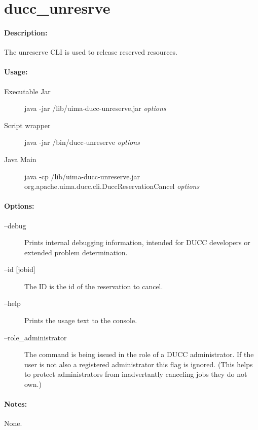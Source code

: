     \section{ducc\_unresrve}

    \paragraph{Description:}
    The unreserve CLI is used to release reserved resources. 

    \paragraph{Usage:}
    \begin{description}
    \item[Executable Jar] java -jar \ducchome/lib/uima-ducc-unreserve.jar {\em options}
    \item[Script wrapper] java -jar \ducchome/bin/ducc-unreserve {\em options}
    \item[Java Main]      java -cp \ducchome/lib/uima-ducc-unreserve.jar org.apache.uima.ducc.cli.DuccReservationCancel {\em options}
    \end{description}

    \paragraph{Options:}
    \begin{description}
        \item[--debug ]          
          Prints internal debugging information, intended for DUCC developers or extended problem determination.
        \item[--id {[jobid]}]
          The ID is the id of the reservation to cancel.
        \item[--help]
          Prints the usage text to the console. 
        \item[--role\_administrator] The command is being issued in the role of a DUCC administrator.
          If the user is not also a registered administrator this flag is ignored.  (This helps to
          protect administrators from inadvertantly canceling jobs they do not own.)          
     \end{description}
        
    \paragraph{Notes:}
    None.

